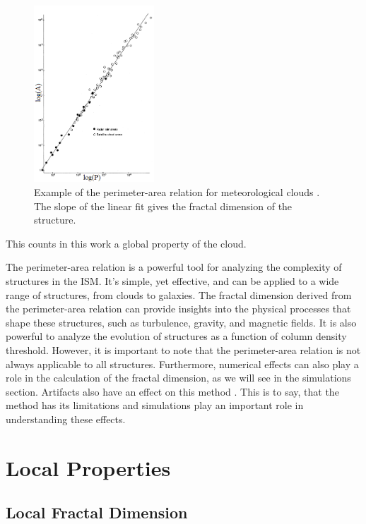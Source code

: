\begin{figure}[t]
    \centering
    \includegraphics[width=0.4\textwidth]{figures/lovejoy.png}
    \caption{Example of the perimeter-area relation for meteorological clouds \cite{lovejoy1982area}. The slope of the linear fit gives the fractal dimension of the structure.}
    \label{fig:perimeter_area_example}
\end{figure}

This counts in this work a global property of the cloud.

The perimeter-area relation is a powerful tool for analyzing the complexity of structures in the ISM. It's simple, yet effective, and can be applied to a wide range of structures, from clouds to galaxies. The fractal dimension derived from the perimeter-area relation can provide insights into the physical processes that shape these structures, such as turbulence, gravity, and magnetic fields. It is also powerful to analyze the evolution of structures as a function of column density threshold.
However, it is important to note that the perimeter-area relation is not always applicable to all structures. Furthermore, numerical effects can also play a role in the calculation of the fractal dimension, as we will see in the simulations section. Artifacts also have an effect on this method \cite{imre2006artificial}. This is to say, that the method has its limitations and simulations play an important role in understanding these effects. 

\section{Local Properties}

\subsection{Local Fractal Dimension}

